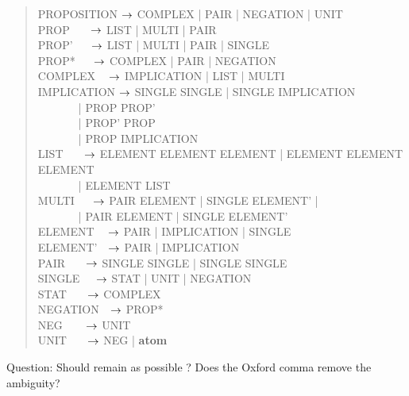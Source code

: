 \documentclass[a4paper]{article}
\begin{document}
\begin{quote}
\ttfamily
PROPOSITION $\rightarrow$ COMPLEX | PAIR | NEGATION | UNIT\\
PROP \(~~~~~~~\)$\rightarrow$ LIST | MULTI | PAIR\\
PROP' \(~~~~~~\)$\rightarrow$ LIST | MULTI | PAIR | SINGLE\\
PROP* \(~~~~~~\)$\rightarrow$ COMPLEX | PAIR | NEGATION\\
COMPLEX \(~~~~\)$\rightarrow$ IMPLICATION | LIST | MULTI\\
IMPLICATION $\rightarrow$ SINGLE  SINGLE
                    | SINGLE  IMPLICATION\\
\(~~~~~~~~~~~~~~~\) |
 PROP PROP'\\
\(~~~~~~~~~~~~~~~\) |
 PROP'  PROP\\
\(~~~~~~~~~~~~~~~\) |
 PROP  
IMPLICATION\\
LIST \(~~~~~~~\)$\rightarrow$ ELEMENT\txt{, } ELEMENT ELEMENT |
                      ELEMENT\txt{, } ELEMENT ELEMENT\\
\(~~~~~~~~~~~~~~~\) | ELEMENT\txt{, } LIST\\
MULTI \(~~~~~~\)$\rightarrow$ PAIR \: ELEMENT |
                      SINGLE  ELEMENT' |\\
\(~~~~~~~~~~~~~~~\) | PAIR  ELEMENT  |
                      SINGLE  ELEMENT'\\
ELEMENT \(~~~~\)$\rightarrow$ PAIR | IMPLICATION | SINGLE\\
ELEMENT' \(~~~\)$\rightarrow$ PAIR | IMPLICATION\\
PAIR \(~~~~~~~\)$\rightarrow$ SINGLE   SINGLE | SINGLE  SINGLE\\
SINGLE \(~~~~~\)$\rightarrow$ STAT | UNIT | NEGATION\\
STAT \(~~~~~~~\)$\rightarrow$ COMPLEX\\
NEGATION \(~~~\)$\rightarrow$ PROP*\\
NEG \(~~~~~~~~\)$\rightarrow$ UNIT\\
UNIT \(~~~~~~~\)$\rightarrow$ NEG | {\bf atom}\\
\end{quote}
Question: Should  remain as possible ? Does the 
Oxford comma remove the ambiguity?
\end{document}
